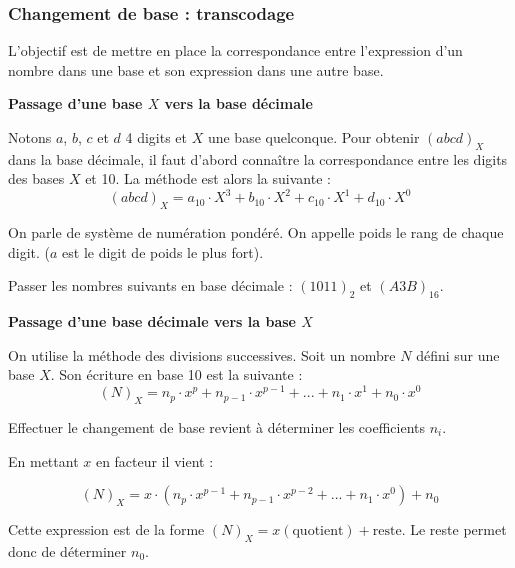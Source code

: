 \documentclass[11pt,oneside]{article}
\begin{document}
\subsubsection{Changement de base : transcodage}
L'objectif est de mettre en place la correspondance entre l'expression d'un nombre dans une base et son expression dans une autre base. 

\begin{methode}
\textbf{Passage d'une base $X$ vers la base décimale}

Notons $a$, $b$, $c$ et $d$ 4 digits et $X$ une base quelconque. Pour obtenir $(abcd)_X$ dans la base décimale, il faut d'abord connaître la correspondance entre les digits des bases $X$ et 10. La méthode est alors la suivante : 
$$
(abcd)_X  = a_{10}\cdot X^3 + b_{10}\cdot X^2 + c_{10}\cdot X^1 + d_{10}\cdot X^0
$$

On parle de système de numération pondéré. On appelle poids le rang de chaque digit. ($a$ est le digit de poids le plus fort).
\end{methode}

\begin{exemple}
Passer les nombres suivants en base décimale : $(1011)_2$ et $(A3B)_{16}$.
\end{exemple}

\begin{methode}
\textbf{Passage d'une base décimale vers la base $X$}

On utilise la méthode des divisions successives. Soit un nombre $N$ défini sur une base $X$. Son écriture en base 10 est la suivante : 
$$
(N)_X = n_{p} \cdot x^{p} + n_{p-1} \cdot x^{p-1} + ... +  n_{1} \cdot x^{1} +  n_{0} \cdot x^{0}
$$

Effectuer le changement de base revient à déterminer les coefficients $n_i$.

\end{methode}


En mettant $x$ en facteur il vient : 

$$
(N)_X =x\cdot\left( n_{p} \cdot x^{p-1} + n_{p-1} \cdot x^{p-2} + ... +  n_{1} \cdot x^{0}\right) +  n_{0} 
$$

Cette expression est de la forme $(N)_X = x(\text{quotient}) + \text{reste}$. Le reste permet donc de déterminer $n_0$. 
\end{document}
